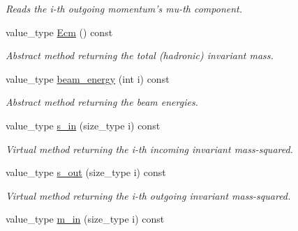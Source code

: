 \begin{DoxyCompactItemize}
\begin{DoxyCompactList}\small\item\em Reads the i-\/th outgoing momentum's mu-\/th component. \end{DoxyCompactList}\item 
\hypertarget{a00529_af4ff8d535dd9b820e6937032b6f7ecff}{value\-\_\-type \hyperlink{a00529_af4ff8d535dd9b820e6937032b6f7ecff}{Ecm} () const }\label{a00529_af4ff8d535dd9b820e6937032b6f7ecff}

\begin{DoxyCompactList}\small\item\em Abstract method returning the total (hadronic) invariant mass. \end{DoxyCompactList}\item 
\hypertarget{a00529_a314adb09433282620cc5e2071f218c06}{value\-\_\-type \hyperlink{a00529_a314adb09433282620cc5e2071f218c06}{beam\-\_\-energy} (int i) const }\label{a00529_a314adb09433282620cc5e2071f218c06}

\begin{DoxyCompactList}\small\item\em Abstract method returning the beam energies. \end{DoxyCompactList}\item 
\hypertarget{a00529_a71d752a5acef264885ab6264fb98d18f}{value\-\_\-type \hyperlink{a00529_a71d752a5acef264885ab6264fb98d18f}{s\-\_\-in} (size\-\_\-type i) const }\label{a00529_a71d752a5acef264885ab6264fb98d18f}

\begin{DoxyCompactList}\small\item\em Virtual method returning the i-\/th incoming invariant mass-\/squared. \end{DoxyCompactList}\item 
\hypertarget{a00529_af3cd0ccd868f83080ba0569511acff5b}{value\-\_\-type \hyperlink{a00529_af3cd0ccd868f83080ba0569511acff5b}{s\-\_\-out} (size\-\_\-type i) const }\label{a00529_af3cd0ccd868f83080ba0569511acff5b}

\begin{DoxyCompactList}\small\item\em Virtual method returning the i-\/th outgoing invariant mass-\/squared. \end{DoxyCompactList}\item 
\hypertarget{a00529_a6dab2ba04d5b791e5cf22c988f046ade}{value\-\_\-type \hyperlink{a00529_a6dab2ba04d5b791e5cf22c988f046ade}{m\-\_\-in} (size\-\_\-type i) const }\label{a00529_a6dab2ba04d5b791e5cf22c988f046ade}


\end{DoxyCompactItemize}
